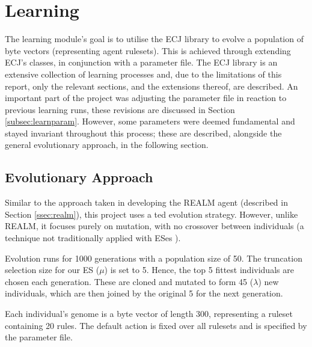 
\section{Learning}

The learning module's goal is to utilise the ECJ library to evolve a population of byte vectors (representing agent rulesets). This is achieved through extending ECJ's classes, in conjunction with a parameter file. The ECJ library is an extensive collection of learning processes and, due to the limitations of this report, only the relevant sections, and the extensions thereof, are described. An important part of the project was adjusting the parameter file in reaction to previous learning runs, these revisions are discussed in Section \ref{subsec:learnparam}. However, some parameters were deemed fundamental and stayed invariant throughout this process; these are described, alongside the general evolutionary approach, in the following section.


\subsection{Evolutionary Approach}
\label{subsec:learndes}

Similar to the approach taken in developing the REALM agent (described in Section \ref{ssec:realm}), this project uses a  ted evolution strategy. However, unlike REALM, it focuses purely on mutation, with no crossover between individuals (a technique not traditionally applied with ESes \cite[p.~]{ecj-tut3}).

Evolution runs for 1000 generations with a population size of 50. The truncation selection size for our ES ($\mu$) is set to 5. Hence, the top 5 fittest individuals are chosen each generation. These are cloned and mutated to form 45 ($\lambda$) new individuals, which are then joined by the original 5 for the next generation.

Each individual's genome is a byte vector of length 300, representing a ruleset containing 20 rules. The default action is fixed over all rulesets and is specified by the parameter file.

